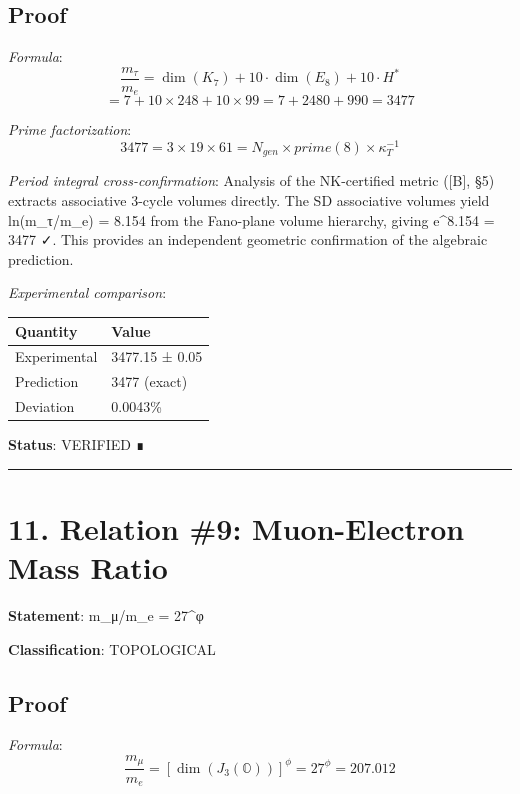 \documentclass[11pt,a4paper]{article}
\begin{document}
\subsection{Proof}\label{proof-6}

\emph{Formula}: \[\frac{m_\tau}{m_e} = \dim(K_7) + 10 \cdot \dim(E_8) + 10 \cdot H^*\] \[= 7 + 10 \times 248 + 10 \times 99 = 7 + 2480 + 990 = 3477\]

\emph{Prime factorization}: \[3477 = 3 \times 19 \times 61 = N_{gen} \times prime(8) \times \kappa_T^{-1}\]

\emph{Period integral cross-confirmation}: Analysis of the NK-certified metric ({[}B{]}, §5) extracts associative 3-cycle volumes directly. The SD associative volumes yield ln(m\_\allowbreak{}τ/m\_\allowbreak{}e) = 8.154 from the Fano-plane volume hierarchy, giving e\^{}8.154 = 3477 ✓. This provides an independent geometric confirmation of the algebraic prediction.

\emph{Experimental comparison}:

\begin{longtable}[]{@{}ll@{}}
\toprule\noalign{}
Quantity & Value \\
\midrule\noalign{}
\endhead
\bottomrule\noalign{}
\endlastfoot
Experimental & 3477.15 ± 0.05 \\
Prediction & 3477 (exact) \\
Deviation & 0.0043\% \\
\end{longtable}

\textbf{Status}: VERIFIED ∎

\begin{center}\rule{\linewidth}{0.5pt}\end{center}

\section{11. Relation \#9: Muon-Electron Mass Ratio}\label{relation-9-muon-electron-mass-ratio}

\textbf{Statement}: m\_\allowbreak{}μ/m\_\allowbreak{}e = 27\^{}φ

\textbf{Classification}: TOPOLOGICAL

\subsection{Proof}\label{proof-7}

\emph{Formula}: \[\frac{m_\mu}{m_e} = [\dim(J_3(\mathbb{O}))]^\phi = 27^\phi = 207.012\]
\end{document}
